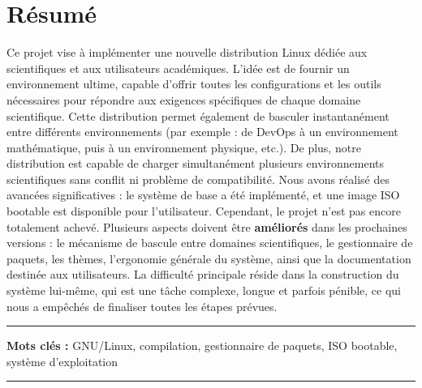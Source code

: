 \chapter*{Résumé}

Ce projet vise à implémenter une nouvelle distribution Linux dédiée aux scientifiques et aux utilisateurs académiques. L’idée est de fournir un environnement ultime, capable d’offrir toutes les configurations et les outils nécessaires pour répondre aux exigences spécifiques de chaque domaine scientifique. Cette distribution permet également de basculer instantanément entre différents environnements (par exemple : de DevOps à un environnement mathématique, puis à un environnement physique, etc.).
\bigbreak
De plus, notre distribution est capable de charger simultanément plusieurs environnements scientifiques sans conflit ni problème de compatibilité.
\bigbreak
Nous avons réalisé des avancées significatives : le système de base a été implémenté, et une image ISO bootable est disponible pour l’utilisateur. Cependant, le projet n’est pas encore totalement achevé. Plusieurs aspects doivent être \textbf{améliorés} dans les prochaines versions : le mécanisme de bascule entre domaines scientifiques, le gestionnaire de paquets, les thèmes, l’ergonomie générale du système, ainsi que la documentation destinée aux utilisateurs.
\bigbreak
La difficulté principale réside dans la construction du système lui-même, qui est une tâche complexe, longue et parfois pénible, ce qui nous a empêchés de finaliser toutes les étapes prévues.

\medskip
\bigbreak
\noindent\rule[2pt]{\textwidth}{0.5pt}

{\textbf{Mots clés :}} GNU/Linux, compilation, gestionnaire de paquets, ISO bootable, système d’exploitation

\noindent\rule[2pt]{\textwidth}{0.5pt}
